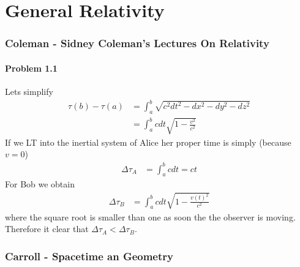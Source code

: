 \documentclass[10pt,a4paper]{book}
\theoremstyle{definition}
\begin{document}
\newpage
\chapter{General Relativity}

\subsection{{\sc Coleman} - Sidney Coleman’s Lectures On Relativity}
\subsubsection{Problem 1.1}
Lets simplify
\begin{align}
\tau(b)-\tau(a)&=\int_a^b\sqrt{c^2dt^2-dx^2-dy^2-dz^2}\\
&=\int_a^bcdt\sqrt{1-\frac{v^2}{c^2}}
\end{align}
If we LT into the inertial system of Alice her proper time is simply (because $v=0$)
\begin{align}
\Delta\tau_A&=\int_a^bcdt=ct
\end{align}
For Bob we obtain
\begin{align}
\Delta\tau_B&=\int_a^bcdt\sqrt{1-\frac{v(t)^2}{c^2}}
\end{align}
where the square root is smaller than one as soon the the observer is moving. Therefore it clear that $\Delta\tau_A<\Delta\tau_B$.


\subsection{{\sc Carroll} - Spacetime an Geometry}
\end{document}
